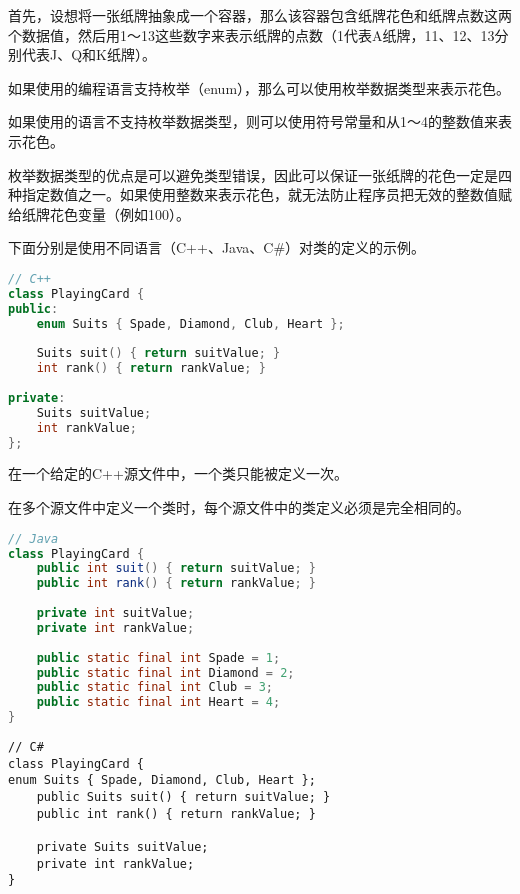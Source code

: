 首先，设想将一张纸牌抽象成一个容器，那么该容器包含纸牌花色和纸牌点数这两个数据值，然后用1～13这些数字来表示纸牌的点数（1代表A纸牌，11、12、13分别代表J、Q和K纸牌）。

\begin{compactitem}
\item 如果使用的编程语言支持枚举（enum），那么可以使用枚举数据类型来表示花色。
\item 如果使用的语言不支持枚举数据类型，则可以使用符号常量和从1～4的整数值来表示花色。
\end{compactitem}


枚举数据类型的优点是可以避免类型错误，因此可以保证一张纸牌的花色一定是四种指定数值之一。如果使用整数来表示花色，就无法防止程序员把无效的整数值赋给纸牌花色变量（例如100）。



下面分别是使用不同语言（C++、Java、C\#）对类的定义的示例。

\begin{lstlisting}[language=C++]
// C++
class PlayingCard {
public:
	enum Suits { Spade, Diamond, Club, Heart };
	
	Suits suit() { return suitValue; }
	int rank() { return rankValue; }
	
private:
	Suits suitValue;
	int rankValue;
};
\end{lstlisting}

\begin{compactitem}
\item 在一个给定的C++源文件中，一个类只能被定义一次。
\item 在多个源文件中定义一个类时，每个源文件中的类定义必须是完全相同的。
\end{compactitem}





\begin{lstlisting}[language=Java]
// Java 
class PlayingCard {
	public int suit() { return suitValue; }
	public int rank() { return rankValue; }
	
	private int suitValue;
	private int rankValue;
	
	public static final int Spade = 1;
	public static final int Diamond = 2;
	public static final int Club = 3;
	public static final int Heart = 4;
}
\end{lstlisting}



\begin{lstlisting}[language={[Sharp]C}]
// C#
class PlayingCard {
enum Suits { Spade, Diamond, Club, Heart };
	public Suits suit() { return suitValue; }
	public int rank() { return rankValue; }
	
	private Suits suitValue;
	private int rankValue;
}
\end{lstlisting}


